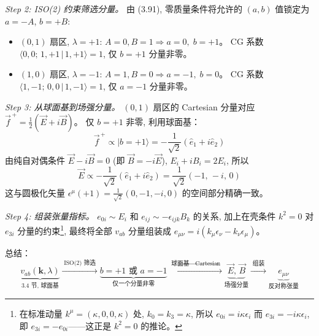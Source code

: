 \textit{Step 2: ISO(2) 约束筛选分量。}
由 (3.91), 零质量条件将允许的 $(a,b)$ 值锁定为 $a=-A$, $b=+B$:
\begin{itemize}
    \item $(0,1)$ 扇区, $\lambda=+1$: $A=0,B=1 \Rightarrow a=0,\;b=+1$。
    CG 系数 $\langle 0,0;\,1,+1\,|\,1,+1\rangle = 1$, 仅 $b=+1$ 分量非零。
    \item $(1,0)$ 扇区, $\lambda=-1$: $A=1,B=0 \Rightarrow a=-1,\;b=0$。
    CG 系数 $\langle 1,-1;\,0,0\,|\,1,-1\rangle = 1$, 仅 $a=-1$ 分量非零。
\end{itemize}

\textit{Step 3: 从球面基到场强分量。}
$(0,1)$ 扇区的 Cartesian 分量对应 $\vec{f}^{\,+}=\frac{1}{2}(\vec{E}+i\vec{B})$。
仅 $b=+1$ 非零, 利用球面基：
\begin{equation}
    \vec{f}^{\,+} \propto |b=+1\rangle = -\frac{1}{\sqrt{2}}(\hat{e}_1 + i\hat{e}_2)
\end{equation}
由纯自对偶条件 $\vec{E}-i\vec{B}=0$ (即 $\vec{B}=-i\vec{E}$),
$E_i+iB_i = 2E_i$, 所以
\begin{equation}
    \vec{E} \propto -\frac{1}{\sqrt{2}}(\hat{e}_1 + i\hat{e}_2)
    = \frac{1}{\sqrt{2}}(-1,\,-i,\,0)
\end{equation}
这与圆极化矢量 $\epsilon^\mu(+1)=\frac{1}{\sqrt{2}}(0,-1,-i,0)$
的空间部分精确一致。

\textit{Step 4: 组装张量指标。}
$e_{0i}\sim E_i$ 和 $e_{ij}\sim -\epsilon_{ijk}B_k$ 的关系,
加上在壳条件 $k^2=0$ 对 $e_{3i}$ 分量的约束\footnote{%
在标准动量 $k^\mu=(\kappa,0,0,\kappa)$ 处, $k_0=k_3=\kappa$,
所以 $e_{0i}=i\kappa\epsilon_i$ 而 $e_{3i}=-i\kappa\epsilon_i$,
即 $e_{3i}=-e_{0i}$——这正是 $k^2=0$ 的推论。},
最终将全部 $v_{ab}$ 分量组装成 $e_{\mu\nu}=i(k_\mu\epsilon_\nu - k_\nu\epsilon_\mu)$。

总结：
\begin{equation*}
    \underbrace{v_{ab}(\mathbf{k},\lambda)}_{\text{3.4 节, 球面基}}
    \xrightarrow{\;\text{ISO(2) 筛选}\;}
    \underbrace{b=+1 \text{ 或 } a=-1}_{\text{仅一个分量非零}}
    \xrightarrow{\;\text{球面基}\to\text{Cartesian}\;}
    \underbrace{\vec{E},\,\vec{B}}_{\text{场强分量}}
    \xrightarrow{\;\text{组装}\;}
    \underbrace{e_{\mu\nu}}_{\text{反对称张量}}
\end{equation*}

